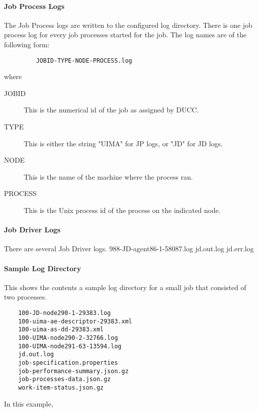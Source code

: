 \paragraph{Job Process Logs}
The Job Process logs are written to the configured log directory.  There is one job process log
for every job processes started for the job.  The log names are of the following form:
\begin{verbatim}
         JOBID-TYPE-NODE-PROCESS.log 
\end{verbatim}
where 
\begin{description}
\item[JOBID] This is the numerical id of the job as assigned by DUCC.
\item[TYPE] This is either the string "UIMA" for JP logs, or "JD" for JD logs.
\item[NODE] This is the name of the machine where the process ran.
\item[PROCESS] This is the Unix process id of the process on the indicated node.
\end{description}

\paragraph{Job Driver Logs}
There are several Job Driver logs.
   988-JD-agent86-1-58087.log
   jd.out.log
   jd.err.log

\paragraph{Sample Log Directory}
This shows the contents a sample log directory for a small job that consisted of two processes.

\begin{verbatim}
    100-JD-node290-1-29383.log 
    100-uima-ae-descriptor-29383.xml 
    100-uima-as-dd-29383.xml 
    100-UIMA-node290-2-32766.log 
    100-UIMA-node291-63-13594.log 
    jd.out.log 
    job-specification.properties 
    job-performance-summary.json.gz
    job-processes-data.json.gz
    work-item-status.json.gz

\end{verbatim}

In this example, 

